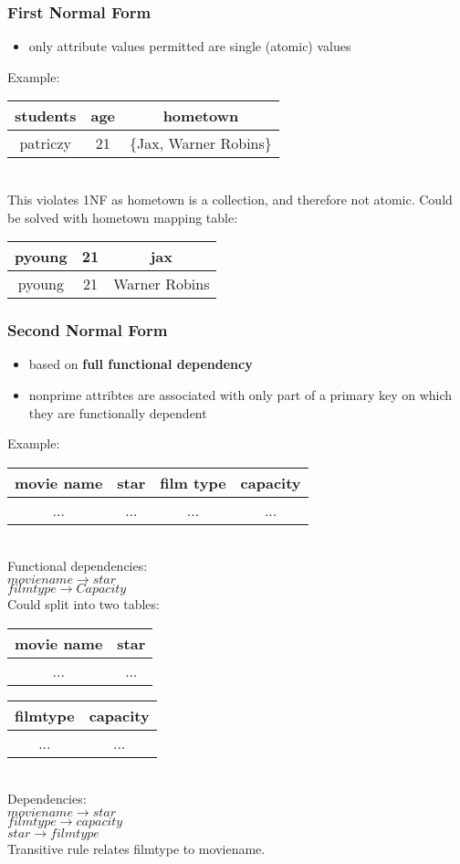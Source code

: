 \documentclass[12pt]{article}
\begin{document}
\subsubsection{First Normal Form}
\begin{itemize}
  \item {only attribute values permitted are single (atomic) values}
\end{itemize}
Example:\\
\begin{tabular}{|c|c|c|}
  \hline
students & age & hometown \\
  \hline
patriczy & 21 & \{Jax, Warner Robins\} \\
  \hline
\end{tabular}\\
This violates 1NF as hometown is a collection, and therefore not atomic. Could
be solved with hometown mapping table:\\
\begin{tabular}{|c|c|c|}
  \hline
 pyoung & 21 & jax\\
  \hline
 pyoung & 21 & Warner Robins\\
  \hline
\end{tabular}

\subsubsection{Second Normal Form}
\begin{itemize}
  \item {based on \textbf{full functional dependency}}
  \item {nonprime attribtes are associated with only part of a primary key on
      which they are functionally dependent}
\end{itemize}
Example:\\
\begin{tabular}{|c|c|c|c|}
  \hline
 movie name & star  & film type & capacity\\
  \hline
 ... & ... & ... & ... \\
  \hline
\end{tabular}\\
Functional dependencies:\\
$moviename \rightarrow star$\\
$filmtype \rightarrow Capacity$\\
Could split into two tables:
\begin{tabular}{|c|c|}
  \hline
 movie name & star  \\
  \hline
 ... & ... \\
  \hline
\end{tabular}
\begin{tabular}{|c|c|}
  \hline
 filmtype & capacity  \\
  \hline
 ... & ... \\
  \hline
\end{tabular}\\
Dependencies:\\
$moviename \rightarrow star$\\
$filmtype \rightarrow capacity$\\
$star \rightarrow filmtype$\\
Transitive rule relates filmtype to moviename.
\end{document}
